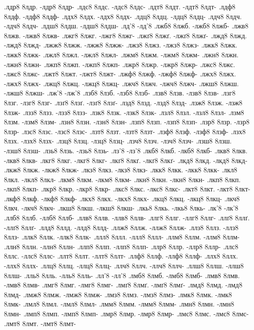 {.лдр8 8лдр. -лдр8 8лдр-
.лдс8 8лдс. -лдс8 8лдс-
.лдт8 8лдт. -лдт8 8лдт-
.лдф8 8лдф. -лдф8 8лдф-
.лдх8 8лдх. -лдх8 8лдх-
.лдц8 8лдц. -лдц8 8лдц-
.лдч8 8лдч. -лдч8 8лдч-
.лдш8 8лдш. -лдш8 8лдш-
.лд'8 -лд'8
.лжб8 8лжб. -лжб8 8лжб-
.лжв8 8лжв. -лжв8 8лжв-
.лжг8 8лжг. -лжг8 8лжг-
.лжґ8 8лжґ. -лжґ8 8лжґ-
.лжд8 8лжд. -лжд8 8лжд-
.лжж8 8лжж. -лжж8 8лжж-
.лжз8 8лжз. -лжз8 8лжз-
.лжк8 8лжк. -лжк8 8лжк-
.лжл8 8лжл. -лжл8 8лжл-
.лжм8 8лжм. -лжм8 8лжм-
.лжн8 8лжн. -лжн8 8лжн-
.лжп8 8лжп. -лжп8 8лжп-
.лжр8 8лжр. -лжр8 8лжр-
.лжс8 8лжс. -лжс8 8лжс-
.лжт8 8лжт. -лжт8 8лжт-
.лжф8 8лжф. -лжф8 8лжф-
.лжх8 8лжх. -лжх8 8лжх-
.лжц8 8лжц. -лжц8 8лжц-
.лжч8 8лжч. -лжч8 8лжч-
.лжш8 8лжш. -лжш8 8лжш-
.лж'8 -лж'8
.лзб8 8лзб. -лзб8 8лзб-
.лзв8 8лзв. -лзв8 8лзв-
.лзг8 8лзг. -лзг8 8лзг-
.лзґ8 8лзґ. -лзґ8 8лзґ-
.лзд8 8лзд. -лзд8 8лзд-
.лзж8 8лзж. -лзж8 8лзж-
.лзз8 8лзз. -лзз8 8лзз-
.лзк8 8лзк. -лзк8 8лзк-
.лзл8 8лзл. -лзл8 8лзл-
.лзм8 8лзм. -лзм8 8лзм-
.лзн8 8лзн. -лзн8 8лзн-
.лзп8 8лзп. -лзп8 8лзп-
.лзр8 8лзр. -лзр8 8лзр-
.лзс8 8лзс. -лзс8 8лзс-
.лзт8 8лзт. -лзт8 8лзт-
.лзф8 8лзф. -лзф8 8лзф-
.лзх8 8лзх. -лзх8 8лзх-
.лзц8 8лзц. -лзц8 8лзц-
.лзч8 8лзч. -лзч8 8лзч-
.лзш8 8лзш. -лзш8 8лзш-
.лзь8 8лзь. -лзь8 8лзь-
.лз'8 -лз'8
.лкб8 8лкб. -лкб8 8лкб-
.лкв8 8лкв. -лкв8 8лкв-
.лкг8 8лкг. -лкг8 8лкг-
.лкґ8 8лкґ. -лкґ8 8лкґ-
.лкд8 8лкд. -лкд8 8лкд-
.лкж8 8лкж. -лкж8 8лкж-
.лкз8 8лкз. -лкз8 8лкз-
.лкк8 8лкк. -лкк8 8лкк-
.лкл8 8лкл. -лкл8 8лкл-
.лкм8 8лкм. -лкм8 8лкм-
.лкн8 8лкн. -лкн8 8лкн-
.лкп8 8лкп. -лкп8 8лкп-
.лкр8 8лкр. -лкр8 8лкр-
.лкс8 8лкс. -лкс8 8лкс-
.лкт8 8лкт. -лкт8 8лкт-
.лкф8 8лкф. -лкф8 8лкф-
.лкх8 8лкх. -лкх8 8лкх-
.лкц8 8лкц. -лкц8 8лкц-
.лкч8 8лкч. -лкч8 8лкч-
.лкш8 8лкш. -лкш8 8лкш-
.лкь8 8лкь. -лкь8 8лкь-
.лк'8 -лк'8
.ллб8 8ллб. -ллб8 8ллб-
.ллв8 8ллв. -ллв8 8ллв-
.ллг8 8ллг. -ллг8 8ллг-
.ллґ8 8ллґ. -ллґ8 8ллґ-
.ллд8 8ллд. -ллд8 8ллд-
.ллж8 8ллж. -ллж8 8ллж-
.ллз8 8ллз. -ллз8 8ллз-
.ллк8 8ллк. -ллк8 8ллк-
.ллл8 8ллл. -ллл8 8ллл-
.ллм8 8ллм. -ллм8 8ллм-
.ллн8 8ллн. -ллн8 8ллн-
.ллп8 8ллп. -ллп8 8ллп-
.ллр8 8ллр. -ллр8 8ллр-
.ллс8 8ллс. -ллс8 8ллс-
.ллт8 8ллт. -ллт8 8ллт-
.ллф8 8ллф. -ллф8 8ллф-
.ллх8 8ллх. -ллх8 8ллх-
.ллц8 8ллц. -ллц8 8ллц-
.ллч8 8ллч. -ллч8 8ллч-
.ллш8 8ллш. -ллш8 8ллш-
.лль8 8лль. -лль8 8лль-
.лл'8 -лл'8
.лмб8 8лмб. -лмб8 8лмб-
.лмв8 8лмв. -лмв8 8лмв-
.лмг8 8лмг. -лмг8 8лмг-
.лмґ8 8лмґ. -лмґ8 8лмґ-
.лмд8 8лмд. -лмд8 8лмд-
.лмж8 8лмж. -лмж8 8лмж-
.лмз8 8лмз. -лмз8 8лмз-
.лмк8 8лмк. -лмк8 8лмк-
.лмл8 8лмл. -лмл8 8лмл-
.лмм8 8лмм. -лмм8 8лмм-
.лмн8 8лмн. -лмн8 8лмн-
.лмп8 8лмп. -лмп8 8лмп-
.лмр8 8лмр. -лмр8 8лмр-
.лмс8 8лмс. -лмс8 8лмс-
.лмт8 8лмт. -лмт8 8лмт-
}
